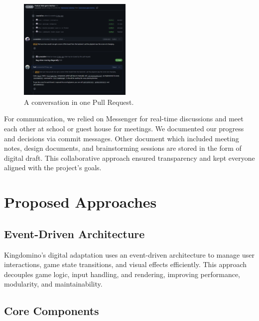 \documentclass[conference]{IEEEtran}
\begin{document}
\begin{figure}[htbp]
    \centerline{\includegraphics[width=0.48\textwidth]{assets/github-pr.png}}
    \caption{A conversation in one Pull Request.}\label{fig:github-pr}
\end{figure}

For communication, we relied on Messenger for real-time discussions and meet
each other at school or guest house for meetings. We documented our progress
and decisions via commit messages. Other document which included meeting notes,
design documents, and brainstorming sessions are stored in the form of digital
draft. This collaborative approach ensured transparency and kept everyone
aligned with the project's goals.

\section{Proposed Approaches}

\subsection{Event-Driven Architecture}

Kingdomino’s digital adaptation uses an event-driven architecture to manage user interactions, game state transitions, and visual effects efficiently. This approach decouples game logic, input handling, and rendering, improving performance, modularity, and maintainability.

\subsection{Core Components}
\end{document}
